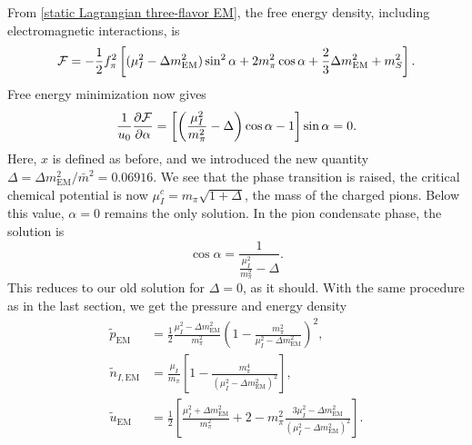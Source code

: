 From \autoref{static Lagrangian three-flavor EM}, the free energy density, including electromagnetic interactions, is
%
\begin{equation}
    \mathcal{F} =
    -\frac{1}{2} f_\pi^2
    \left[
        (\mu_I^2 - \Delta m_\text{EM}^2)\sin^2\alpha + 2 m_\pi^2\cos\alpha 
        + \frac{2}{3}\Delta m_\text{EM}^2 + m_S^2
    \right].
\end{equation}
%
Free energy minimization now gives
%
\begin{equation}
    \frac{1}{u_0}\pdv{\mathcal{F}}{\alpha}
    = 
    \left[ \left( \frac{\mu_I^2}{m_\pi^2} - \Delta \right) \cos \alpha - 1\right] \sin \alpha = 0.
\end{equation}
%
Here, $x$ is defined as before, and we introduced the new quantity $\Delta = \Delta m_{\text{EM}}^2 / \bar m^2= 0.06916$.
We see that the phase transition is raised, the critical chemical potential is now $\mu_I^c = m_\pi \sqrt{1 + \Delta}$, the mass of the charged pions.
Below this value, $\alpha = 0$ remains the only solution.
In the pion condensate phase, the solution is
%
\begin{equation}
    \cos \alpha 
    = \frac{1}{\frac{\mu_I^2}{m_\pi^2} -  \Delta}.
\end{equation}
%
This reduces to our old solution for $\Delta = 0$, as it should.
With the same procedure as in the last section, we get the pressure and energy density
%
\begin{align}
    \label{pressure with em interaction}
    \tilde p_\text{EM}
    & = \frac{1}{2} \frac{\mu_I^2 - \Delta m_\text{EM}^2}{m_\pi^2}
    \left(
        1-  \frac{m_\pi^2}{ \mu_I^2 - \Delta m_\text{EM}^2 }
    \right)^2, \\
    \tilde n_{I,\text{EM}} & =
    \frac{\mu_I}{m_\pi}
    \left[  1 - \frac{m_\pi^4}{(\mu_I^2 - \Delta m_\text{EM}^2)^2} \right],\\
    \tilde u_\text{EM}
    &= \frac{1}{2} 
    \left[
        \frac{\mu_I^2+\Delta m_\text{EM}^2}{m_\pi^2}+ 2
        - m_\pi^2 \frac{3 {\mu_I^2} - \Delta m_\text{EM}^2}
        {\left( \mu_I^2- \Delta m_\text{EM}^2\right)^2}
    \right].
\end{align}
